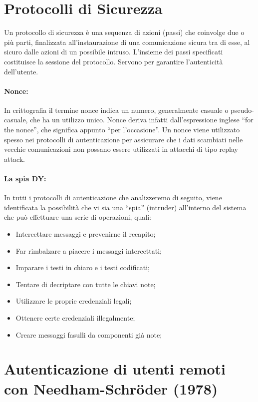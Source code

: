 \section{Protocolli di Sicurezza}

Un protocollo di sicurezza è una sequenza di azioni (passi) che
coinvolge due o più parti,
finalizzata all'instaurazione di una comunicazione sicura tra di esse,
al sicuro dalle azioni di un
possibile intruso. L'insieme dei passi specificati costituisce la sessione
del protocollo.
Servono per garantire l'autenticità dell'utente.

\paragraph{Nonce: }
In crittografia il termine nonce indica un numero, generalmente casuale
o pseudo-casuale,
che ha un utilizzo unico. Nonce deriva infatti dall'espressione inglese
``for the nonce'', che significa
appunto ``per l'occasione''. Un nonce viene utilizzato spesso nei protocolli
di autenticazione per
assicurare che i dati scambiati nelle vecchie comunicazioni non possano
essere utilizzati in
attacchi di tipo replay attack.\\

\paragraph{La spia DY:}
In tutti i protocolli di autenticazione che analizzeremo di seguito, viene identificata la possibilità che vi sia una ``spia'' (intruder) all'interno del sistema che può effettuare una serie di operazioni, quali:
\begin{itemize}
    \item Intercettare messaggi e prevenirne il recapito;
    \item Far rimbalzare a piacere i messaggi intercettati;
    \item Imparare i testi in chiaro e i testi codificati;
    \item Tentare di decriptare con tutte le chiavi note;
    \item Utilizzare le proprie credenziali legali;
    \item Ottenere certe credenziali illegalmente;
    \item Creare messaggi fasulli da componenti già note;
\end{itemize}

\section[Autenticazione di utenti remoti con Needham-Schr\"{o}der
(1978)]{Autenticazione di utenti remoti\\ con Needham-Schr\"{o}der (1978)}

